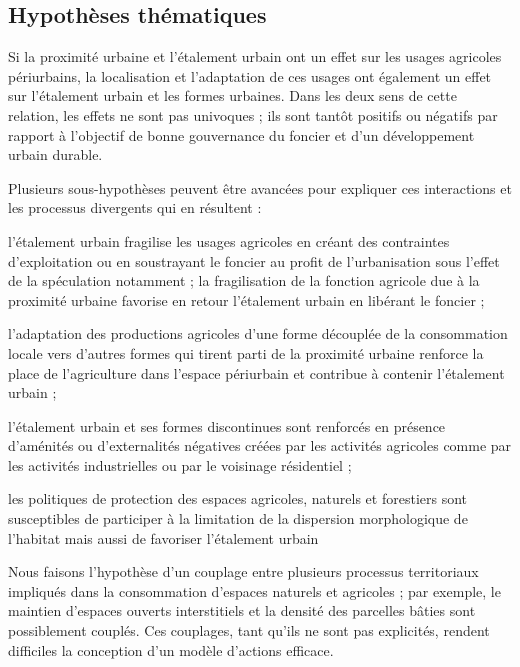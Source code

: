 \subsection{Hypothèses thématiques}

\startitemize[n]

\item	Si la proximité urbaine
	et l'étalement urbain ont un effet sur les usages agricoles
	périurbains, la localisation et l'adaptation de ces usages
	ont également un effet sur l'étalement urbain et les formes urbaines.
	Dans les deux sens de cette relation, les effets ne sont pas univoques ;
	ils sont tantôt positifs ou négatifs par rapport à l'objectif de bonne gouvernance
	du foncier et d'un développement urbain durable.

	Plusieurs sous-hypothèses peuvent être avancées
	pour expliquer ces interactions et les processus divergents
	qui en résultent :

	\startitemize[a,packed]

	\item	l'étalement urbain fragilise les usages agricoles
		en créant des contraintes d'exploitation ou
		en soustrayant le foncier au profit de l'urbanisation
		sous l'effet de la spéculation notamment ;
		la fragilisation de la fonction agricole
		due à la proximité urbaine favorise en retour l'étalement urbain
		en libérant le foncier ;

	\item	l'adaptation des productions agricoles d'une forme
		découplée de la consommation locale vers d'autres
		formes qui tirent parti de la proximité urbaine
		renforce la place de l'agriculture dans l'espace périurbain
		et contribue à contenir l'étalement urbain ;

	\item	l'étalement urbain et ses formes discontinues sont renforcés
		en présence d'aménités ou d'externalités négatives créées par les activités
		agricoles comme par les activités industrielles
		ou par le voisinage résidentiel ;

	\item	les politiques de protection des espaces agricoles, naturels
		et forestiers sont susceptibles de participer
		à la limitation de la dispersion morphologique de l'habitat
		mais aussi de favoriser l'étalement urbain

	\stopitemize

\item	Nous faisons l'hypothèse d'un couplage entre plusieurs processus territoriaux
	impliqués dans la consommation d'espaces naturels et agricoles ;
	par exemple, le maintien d'espaces ouverts
	interstitiels et la densité des parcelles bâties sont possiblement couplés.
	Ces couplages, tant qu'ils ne sont pas explicités,
	rendent difficiles la conception d'un modèle d'actions efficace.

\stopitemize